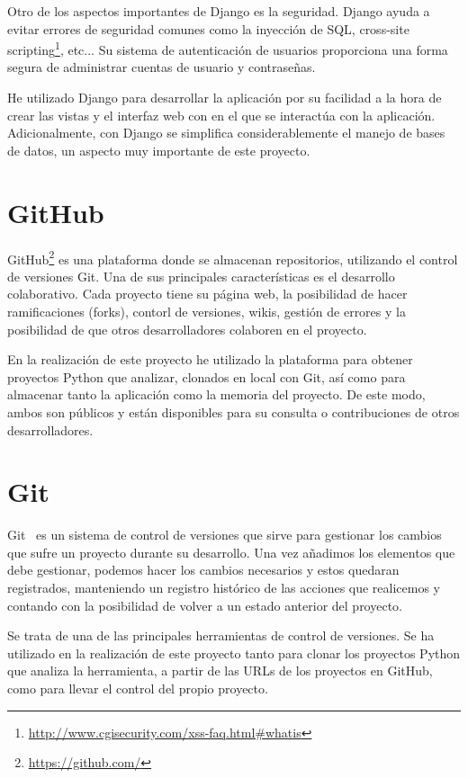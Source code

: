 \documentclass[a4paper, 12pt]{book}
\begin{document}
Otro de los aspectos importantes de Django es la seguridad. Django ayuda a evitar errores de seguridad comunes como la inyección de SQL, cross-site scripting\footnote{\url{http://www.cgisecurity.com/xss-faq.html#whatis}}, etc... Su sistema de autenticación de usuarios proporciona una forma segura de administrar cuentas de usuario y contraseñas.

He utilizado Django para desarrollar la aplicación por su facilidad a la hora de crear las vistas y el interfaz web con en el que se interactúa con la aplicación. Adicionalmente, con Django se simplifica considerablemente el manejo de bases de datos, un aspecto muy importante de este proyecto.

\section{GitHub} 
\label{sec:seccion4}
GitHub\footnote{\url{https://github.com/}} es una plataforma donde se almacenan repositorios, utilizando el control de versiones Git. Una de sus principales características es el desarrollo colaborativo. Cada proyecto tiene su página web, la posibilidad de hacer ramificaciones (forks), contorl de versiones, wikis, gestión de errores y la posibilidad de que otros desarrolladores colaboren en el proyecto.

En la realización de este proyecto he utilizado la plataforma para obtener proyectos Python que analizar, clonados en local con Git, así como para almacenar tanto la aplicación como la memoria del proyecto. De este modo, ambos son públicos y están disponibles para su consulta o contribuciones de otros desarrolladores.

\section{Git} 
\label{sec:seccion5}
Git~\cite{git:_git} es un sistema de control de versiones que sirve para gestionar los cambios que sufre un proyecto durante su desarrollo. Una vez añadimos los elementos que debe gestionar, podemos hacer los cambios necesarios y estos quedaran registrados, manteniendo un registro histórico de las acciones que realicemos y contando con la posibilidad de volver a un estado anterior del proyecto.

Se trata de una de las principales herramientas de control de versiones. Se ha utilizado en la realización de este proyecto tanto para clonar los proyectos Python que analiza la herramienta, a partir de las URLs de los proyectos en GitHub, como para llevar el control del propio proyecto.
\end{document}
